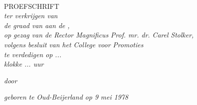 \documentclass[11pt, a4paper]{Thesis} %
\title{\ttitle} %
\begin{document}
\frontmatter %


\fancyhead{} %
\rhead{\thepage} %
\lhead{} %

\pagestyle{fancy} %

\newcommand{\HRule}{\rule{\linewidth}{0.5mm}} %

\hypersetup{pdfsubject=\subjectname}
\hypersetup{pdfauthor=\authornames}
\hypersetup{pdfkeywords=\keywordnames}


\begin{titlepage}
\begin{center}

{\huge \bfseries \ttitle}\\[0.4cm] %

\textsc{\Large PROEFSCHRIFT}\\[0.5cm] %

\large \textit{ter verkrijgen van\\
de graad van \degreename{} aan de \univname,\\
op gezag van de Rector Magnificus Prof. mr. dr. Carel Stolker,\\
volgens besluit van het College voor Promoties\\
te verdedigen op ...\\
klokke ... uur}

\large \textit{door}

\authornames

\large \textit{geboren te Oud-Beijerland op 9 mei 1978}
 
\vfill
\end{center}

\end{titlepage}

\end{document}
